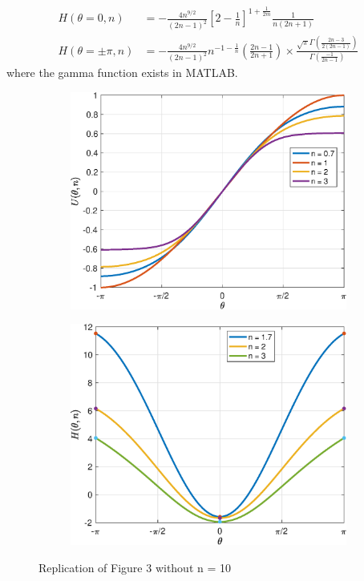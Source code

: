 \documentclass[12pt,3p]{article}
\numberwithin{equation}{section}
\begin{document}
\begin{align*}
H(\theta=0, n) &= -\frac{4 n^{9 / 2}}{(2 n-1)^{2}}\left[2-\frac{1}{n}\right]^{1+\frac{1}{2 m}} \frac{1}{n(2 n+1)} \\
H(\theta = \pm \pi, n) &= -\frac{4 n^{9 / 2}}{(2 n-1)^{2}} n^{-1-\frac{1}{n}}\left(\frac{2 n-1}{2 n+1}\right) \times \frac{\sqrt{\pi} \Gamma\left(\frac{2 n-3}{2(2 n-1)}\right)}{\Gamma\left(\frac{-1}{2 n-1}\right)}
\end{align*}
where the gamma function exists in MATLAB. \\
\begin{figure}[h]
    \centering
    \begin{subfigure}[b]{0.45\textwidth}
        \includegraphics[width=\textwidth]{Fig3A.eps}
    \end{subfigure}
    \quad %
    \begin{subfigure}[b]{0.45\textwidth}
        \includegraphics[width=\textwidth]{Fig3B.eps}
    \end{subfigure}
    \caption{Replication of Figure 3 without n = 10}
\end{figure}
\end{document}

